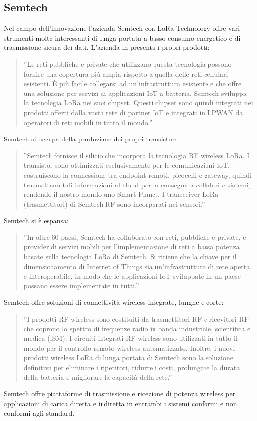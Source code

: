 \documentclass[a4paper]{report} %
\begin{document}
\subsection{Semtech}
Nel campo dell'innovazione l'azienda Semtech con LoRa Technology offre vari strumenti molto interessanti di lunga portata a basso consumo energetico e di trasmissione sicura dei dati. L'azienda in \cite{art:rif.24} presenta i propri prodotti: 
\begin{quote}
	''Le reti pubbliche e private che utilizzano questa tecnologia possono fornire una copertura più ampia rispetto a quella delle reti cellulari esistenti. È più facile collegarsi ad un'infrastruttura esistente e che offre una soluzione per servizi di applicazioni IoT a batteria. Semtech sviluppa la tecnologia LoRa nei suoi chipset. Questi chipset sono quindi integrati nei prodotti offerti dalla vasta rete di partner IoT e integrati in LPWAN da operatori di reti mobili in tutto il mondo.''
\end{quote}
Semtech si occupa della produzione dei propri transistor: 
\begin{quote}
	''Semtech fornisce il silicio che incorpora la tecnologia RF wireless LoRa. I transistor sono ottimizzati esclusivamente per le comunicazioni IoT, costruiscono la connessione tra endpoint remoti, picocelli e gateway, quindi trasmettono tali informazioni al cloud per la consegna a cellulari e sistemi, rendendo il nostro mondo uno Smart Planet. I transceiver LoRa (trasmettitori) di Semtech RF sono incorporati nei sensori.''
\end{quote}
Semtech si è espansa:
\begin{quote}
	''In oltre 60 paesi, Semtech ha collaborato con reti, pubbliche e private, e provider di servizi mobili per l'implementazione di reti a bassa potenza basate sulla tecnologia LoRa di Semtech. Si ritiene che la chiave per il dimensionamento di Internet of Things sia un'infrastruttura di rete aperta e interoperabile, in modo che le applicazioni IoT sviluppate in un paese possano essere implementate in tutti.''
\end{quote}
Semtech offre soluzioni di connettività wireless integrate, lunghe e corte: 
\begin{quote}
	''I prodotti RF wireless sono costituiti da  trasmettitori RF e ricevitori RF che coprono lo spettro di frequenze radio in banda industriale, scientifica e medica (ISM). I circuiti integrati RF wireless sono utilizzati in tutto il mondo per il controllo remoto wireless automatizzato. Inoltre, i nuovi prodotti wireless LoRa di lunga portata di Semtech sono la soluzione definitiva per eliminare i ripetitori, ridurre i costi, prolungare la durata della batteria e migliorare la capacità della rete.''
\end{quote}
Semtech offre piattaforme di trasmissione e ricezione di potenza wireless per applicazioni di carica diretta e indiretta in entrambi i sistemi conformi e non conformi agli standard. 
\end{document}
